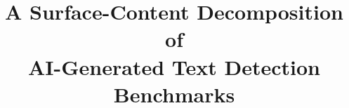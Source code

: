 \documentclass[conference,a4paper]{IEEEtran}
\begin{document}
\title{A Surface-Content Decomposition of\\AI-Generated Text Detection Benchmarks}

\makeatletter
\newcommand{\linebreakand}{%
  \end{@IEEEauthorhalign}
  \hfill\mbox{}\par
  \mbox{}\hfill\begin{@IEEEauthorhalign}
}
\makeatother

\end{document}
